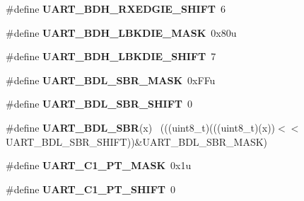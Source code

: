 \begin{DoxyCompactItemize}
\item 
\hypertarget{group___u_a_r_t___register___masks_ga97c5d15ae3144492e364744236aa10f7}{}\#define {\bfseries U\+A\+R\+T\+\_\+\+B\+D\+H\+\_\+\+R\+X\+E\+D\+G\+I\+E\+\_\+\+S\+H\+I\+F\+T}~6\label{group___u_a_r_t___register___masks_ga97c5d15ae3144492e364744236aa10f7}

\item 
\hypertarget{group___u_a_r_t___register___masks_ga88fb29d1cb045a09e851a31c689ef60e}{}\#define {\bfseries U\+A\+R\+T\+\_\+\+B\+D\+H\+\_\+\+L\+B\+K\+D\+I\+E\+\_\+\+M\+A\+S\+K}~0x80u\label{group___u_a_r_t___register___masks_ga88fb29d1cb045a09e851a31c689ef60e}

\item 
\hypertarget{group___u_a_r_t___register___masks_gace1227bd2507a7c5df95398e097cb7af}{}\#define {\bfseries U\+A\+R\+T\+\_\+\+B\+D\+H\+\_\+\+L\+B\+K\+D\+I\+E\+\_\+\+S\+H\+I\+F\+T}~7\label{group___u_a_r_t___register___masks_gace1227bd2507a7c5df95398e097cb7af}

\item 
\hypertarget{group___u_a_r_t___register___masks_ga4471e77a5cfda8db1950aac0b204d964}{}\#define {\bfseries U\+A\+R\+T\+\_\+\+B\+D\+L\+\_\+\+S\+B\+R\+\_\+\+M\+A\+S\+K}~0x\+F\+Fu\label{group___u_a_r_t___register___masks_ga4471e77a5cfda8db1950aac0b204d964}

\item 
\hypertarget{group___u_a_r_t___register___masks_gad59af590652e14fd8d4a0d46ce48205a}{}\#define {\bfseries U\+A\+R\+T\+\_\+\+B\+D\+L\+\_\+\+S\+B\+R\+\_\+\+S\+H\+I\+F\+T}~0\label{group___u_a_r_t___register___masks_gad59af590652e14fd8d4a0d46ce48205a}

\item 
\hypertarget{group___u_a_r_t___register___masks_ga9a4c1b71fc2de587237f1381f0f69d75}{}\#define {\bfseries U\+A\+R\+T\+\_\+\+B\+D\+L\+\_\+\+S\+B\+R}(x)                                                ~(((uint8\+\_\+t)(((uint8\+\_\+t)(x))$<$$<$U\+A\+R\+T\+\_\+\+B\+D\+L\+\_\+\+S\+B\+R\+\_\+\+S\+H\+I\+F\+T))\&U\+A\+R\+T\+\_\+\+B\+D\+L\+\_\+\+S\+B\+R\+\_\+\+M\+A\+S\+K)\label{group___u_a_r_t___register___masks_ga9a4c1b71fc2de587237f1381f0f69d75}

\item 
\hypertarget{group___u_a_r_t___register___masks_ga5a1c05b549b94de9232fbac665b3f584}{}\#define {\bfseries U\+A\+R\+T\+\_\+\+C1\+\_\+\+P\+T\+\_\+\+M\+A\+S\+K}~0x1u\label{group___u_a_r_t___register___masks_ga5a1c05b549b94de9232fbac665b3f584}

\item 
\hypertarget{group___u_a_r_t___register___masks_ga1638e7faa5063dab6afd34353fde4c89}{}\#define {\bfseries U\+A\+R\+T\+\_\+\+C1\+\_\+\+P\+T\+\_\+\+S\+H\+I\+F\+T}~0\label{group___u_a_r_t___register___masks_ga1638e7faa5063dab6afd34353fde4c89}


\end{DoxyCompactItemize}
